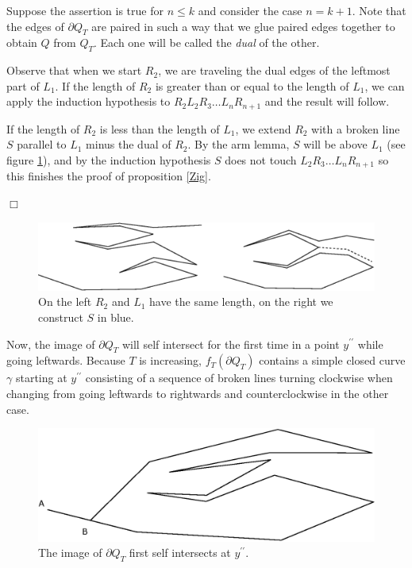 \documentclass[openright, 12pt]{article}
\begin{document}
Suppose the assertion is true for $n \leq k$ and consider the case $n=k+1$.  Note that the edges of $\partial Q_T$ are paired in such a way that we glue paired edges together to obtain $Q$ from $Q_T$. Each one will be called the \textit{dual} of the other.

Observe that when we start $R_2$, we are traveling the dual edges of the leftmost part of $L_1$. If the length of $R_2$ is greater than or equal to the length of $L_1$, we can apply the induction hypothesis to $R_2L_2R_3 \ldots L_nR_{n+1}$ and the result will follow. 

If the length of $R_2$ is less than the length of $L_1$, we extend $R_2 $ with a broken line $S$ parallel to $L_1$ minus the dual of $R_2$. By the arm lemma, $S$ will be above $L_1$ (see figure \ref{S}), and by the induction hypothesis $S$ does not touch $L_2R_3 \ldots L_nR_{n+1}$ so this finishes the proof of proposition \ref{Zig}.

\hfill $\Box$



\begin{figure}[h]
\centering
\includegraphics[scale=0.7]{S.eps}
\caption{On the left $R_2$ and $L_1$ have the same length, on the right we construct $S$ in blue.} \label{S}
\end{figure}




Now, the image of $\partial  Q_T$ will self intersect for the first time in a point $y^{\prime\prime}$ while going leftwards. Because $T$ is increasing, $f_T(\partial Q_T)$ contains a simple closed curve $\gamma$ starting at $y^{\prime \prime}$ consisting of a sequence of broken lines turning clockwise when changing from going leftwards to rightwards and counterclockwise in the other case.




\begin{figure}[h]
\centering
{}
\includegraphics[scale=0.7]{Prime.eps}
\caption{The image of $\partial Q_T$ first self intersects at $y^{\prime \prime}$.}
\end{figure}
\end{document}

